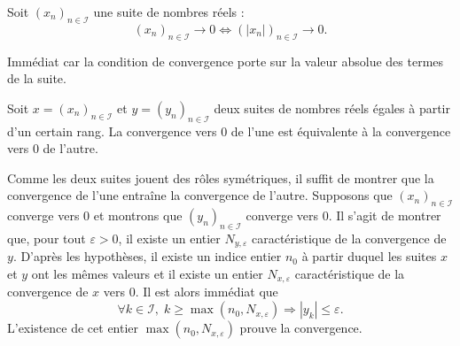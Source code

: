 \begin{propn}
Soit $(x_n)_{n\in \mathcal I}$ une suite de nombres réels :
\begin{displaymath}
 (x_n)_{n\in \mathcal I} \rightarrow 0 \Leftrightarrow (|x_n|)_{n\in \mathcal I} \rightarrow 0 .
\end{displaymath} 
\end{propn}
\begin{demo}
  Immédiat car la condition de convergence porte sur la valeur absolue des termes de la suite.
\end{demo}

\begin{propn}
 Soit $x = (x_n)_{n\in \mathcal I}$ et $y = (y_n)_{n\in \mathcal I}$ deux suites de nombres réels égales à partir d'un certain rang. La convergence vers $0$ de l'une est équivalente à la convergence vers $0$ de l'autre.
\end{propn}
\begin{demo}
  Comme les deux suites jouent des rôles symétriques, il suffit de montrer que la convergence de l'une entraîne la convergence de l'autre.\newline
  Supposons que $(x_n)_{n\in \mathcal I}$ converge vers $0$ et montrons que $(y_n)_{n\in \mathcal I}$ converge vers $0$.\newline
  Il s'agit de montrer que, pour tout $\varepsilon >0$, il existe un entier $N_{y, \varepsilon}$ caractéristique de la convergence de $y$.\newline
  D'après les hypothèses, il existe un indice entier $n_0$ à partir duquel les suites $x$ et $y$ ont les mêmes valeurs et il existe un entier $N_{x,\varepsilon}$ caractéristique de la convergence de $x$ vers $0$. Il est alors immédiat que 
\begin{displaymath}
\forall k\in \mathcal{I}, \; k\geq \max(n_0, N_{x,\varepsilon}) \Rightarrow |y_k| \leq \varepsilon . 
\end{displaymath}
L'existence de cet entier $\max(n_0, N_{x,\varepsilon})$ prouve la convergence.  
\end{demo}

